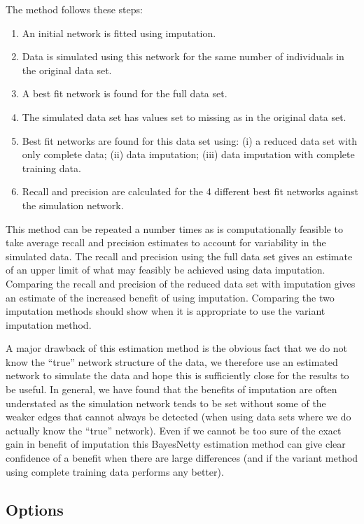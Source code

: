 \documentclass[a4paper,12pt]{article}
\begin{document}
The method follows these steps: 
\begin{enumerate}

\item An initial network is fitted using imputation. 
\item Data is simulated using this network for the same number of individuals in the original data set. 
\item A best fit network is found for the full data set. 
\item The simulated data set has values set to missing as in the original data set. 
\item Best fit networks are found for this data set using: (i) a reduced data set with only complete data; (ii) data imputation; (iii) data imputation with complete training data. 
\item Recall and precision are calculated for the 4 different best fit networks against the simulation network.\end{enumerate}

This method can be repeated a number times as is computationally feasible to take average recall and precision estimates to account for variability in the simulated data. The recall and precision using the full data set gives an estimate of an upper limit of what may feasibly be achieved using data imputation. Comparing the recall and precision of the reduced data set with imputation gives an estimate of the increased benefit of using imputation. Comparing the two imputation methods should show when it is appropriate to use the variant imputation method. 

A major drawback of this estimation method is the obvious fact that we do not know the ``true'' network structure of the data, we therefore use an estimated network to simulate the data and hope this is sufficiently close for the results to be useful. In general, we have found that the benefits of imputation are often understated as the simulation network tends to be set without some of the weaker edges that cannot always be detected (when using data sets where we do actually know the ``true'' network). Even if we cannot be too sure of the exact gain in benefit of imputation this BayesNetty estimation method can give clear confidence of a benefit when there are large differences (and if the variant method using complete training data performs any better). 
\subsection{Options}
\label{estimate-impute-options}
\end{document}
